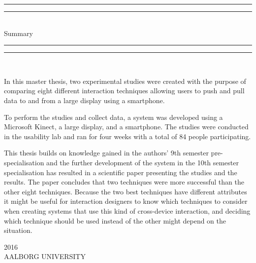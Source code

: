 \begin{dummy}

	\textheight
	\centering
	\vspace*{\baselineskip}
	\rule{\textwidth}{2pt}\vspace*{-\baselineskip}\vspace*{2pt}
	\rule{\textwidth}{0.4pt}\\[\baselineskip]
	{\LARGE Summary}\\[0.2\baselineskip]
	\rule{\textwidth}{0.4pt}\vspace*{-\baselineskip}\vspace{3.2pt}
	\rule{\textwidth}{2pt}\\[\baselineskip]
	\scshape
	{} \par
	\vspace*{2\baselineskip}
	\vspace*{2\baselineskip}

\begin{summary}
In this master thesis, two experimental studies were created with the purpose of comparing eight different interaction techniques allowing users to push and pull data to and from a large display using a smartphone.

To perform the studies and collect data, a system was developed using a Microsoft Kinect, a large display, and a smartphone.
The studies were conducted in the usability lab and ran for four weeks with a total of 84 people participating. 

This thesis builds on knowledge gained in the authors' 9th semester pre-specialisation and the further development of the system in the 10th semester specialisation has resulted in a scientific paper presenting the studies and the results.
The paper concludes that two techniques were more successful than the other eight techniques.
Because the two best techniques have different attributes it might be useful for interaction designers to know which techniques to consider when creating systems that use this kind of cross-device interaction, and deciding which technique should be used instead of the other might depend on the situation.
\end{summary}
	\vspace*{2\baselineskip}
		{\scshape 2016} \\
		{\large AALBORG UNIVERSITY}\par
	
\end{dummy}